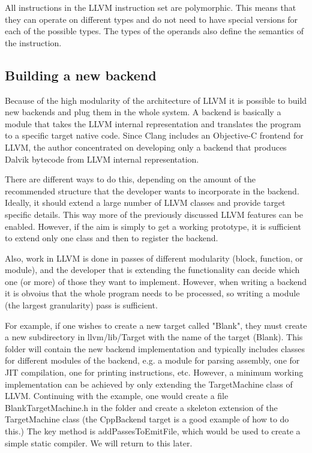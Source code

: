 \documentclass[parskip]{cs4rep}
\begin{document}
All instructions in the LLVM instruction set are polymorphic. This means that they can operate on different types and do not need to have special versions for each of the possible types. The types of the operands also define the semantics of the instruction.

\subsection{Building a new backend}

Because of the high modularity of the architecture of LLVM it is possible to build new backends and plug them in the whole system. A backend is basically a module that takes the LLVM internal representation and translates the program to a specific target native code. Since Clang includes an Objective-C frontend for LLVM, the author concentrated on developing only a backend that produces Dalvik bytecode from LLVM internal representation.

There are different ways to do this, depending on the amount of the recommended structure that the developer wants to incorporate in the backend. Ideally, it should extend a large number of LLVM classes and provide target specific details\cite{P8}. This way more of the previously discussed LLVM features can be enabled. However, if the aim is simply to get a working prototype, it is sufficient to extend only one class and then to register the backend.

Also, work in LLVM is done in passes of different modularity (block, function, or module), and the developer that is extending the functionality can decide which one (or more) of those they want to implement. However, when writing a backend it is obvoius that the whole program needs to be processed, so writing a module (the largest granularity) pass is sufficient.

For example, if one wishes to create a new target called "Blank", they must create a new subdirectory in llvm/lib/Target with the name of the target (Blank). This folder will contain the new backend implementation and typically includes classes for different modules of the backend, e.g. a module for parsing assembly, one for JIT compilation, one for printing instructions, etc. However, a minimum working implementation can be achieved by only extending the TargetMachine class of LLVM. Continuing with the example, one would create a file BlankTargetMachine.h in the folder and create a skeleton extension of the TargetMachine class (the CppBackend target is a good example of how to do this.) The key method is addPassesToEmitFile, which would be used to create a simple static compiler. We will return to this later.
\end{document}
